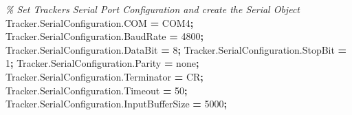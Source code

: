 \documentclass[
  a4paper,
  twoside,
  titlepage,
  11pt]{article}
\newenvironment{Shaded}{\begin{snugshade}}{\end{snugshade}}
\newcommand{\CommentTok}[1]{\textcolor[rgb]{0.56,0.35,0.01}{\textit{#1}}}
\newcommand{\FloatTok}[1]{\textcolor[rgb]{0.00,0.00,0.81}{#1}}
\newcommand{\NormalTok}[1]{#1}
\newcommand{\OperatorTok}[1]{\textcolor[rgb]{0.81,0.36,0.00}{\textbf{#1}}}
\newcommand{\SpecialStringTok}[1]{\textcolor[rgb]{0.31,0.60,0.02}{#1}}
\newcommand{\VariableTok}[1]{\textcolor[rgb]{0.00,0.00,0.00}{#1}}
\numberwithin{equation}{section}
\numberwithin{figure}{section}
\numberwithin{table}{section}
\begin{document}
\begin{Shaded}
\begin{Highlighting}[]
\CommentTok{\% Set Tracker\textquotesingle{}s Serial Port Configuration and create the Serial Object}
\VariableTok{Tracker}\NormalTok{.}\VariableTok{SerialConfiguration}\NormalTok{.}\VariableTok{COM}             \OperatorTok{=} \SpecialStringTok{\textquotesingle{}COM4\textquotesingle{}}\OperatorTok{;}
\VariableTok{Tracker}\NormalTok{.}\VariableTok{SerialConfiguration}\NormalTok{.}\VariableTok{BaudRate}        \OperatorTok{=} \FloatTok{4800}\OperatorTok{;}
\VariableTok{Tracker}\NormalTok{.}\VariableTok{SerialConfiguration}\NormalTok{.}\VariableTok{DataBit}         \OperatorTok{=} \FloatTok{8}\OperatorTok{;}
\VariableTok{Tracker}\NormalTok{.}\VariableTok{SerialConfiguration}\NormalTok{.}\VariableTok{StopBit}         \OperatorTok{=} \FloatTok{1}\OperatorTok{;}
\VariableTok{Tracker}\NormalTok{.}\VariableTok{SerialConfiguration}\NormalTok{.}\VariableTok{Parity}          \OperatorTok{=} \SpecialStringTok{\textquotesingle{}none\textquotesingle{}}\OperatorTok{;}
\VariableTok{Tracker}\NormalTok{.}\VariableTok{SerialConfiguration}\NormalTok{.}\VariableTok{Terminator}      \OperatorTok{=} \SpecialStringTok{\textquotesingle{}CR\textquotesingle{}}\OperatorTok{;}
\VariableTok{Tracker}\NormalTok{.}\VariableTok{SerialConfiguration}\NormalTok{.}\VariableTok{Timeout}         \OperatorTok{=} \FloatTok{50}\OperatorTok{;}
\VariableTok{Tracker}\NormalTok{.}\VariableTok{SerialConfiguration}\NormalTok{.}\VariableTok{InputBufferSize} \OperatorTok{=} \FloatTok{5000}\OperatorTok{;}


\end{Highlighting}
\end{Shaded}
\end{document}

